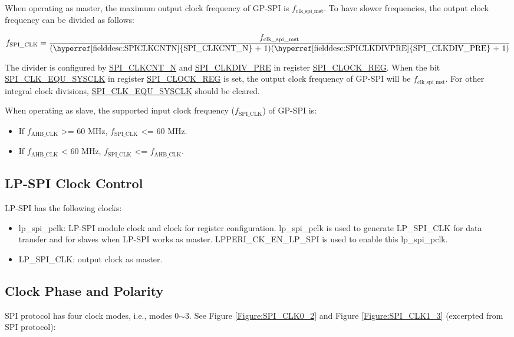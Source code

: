 \documentclass[main\_\_EN.tex]{subfiles}
\begin{document}
When operating as master, the maximum output clock frequency of GP-SPI is $f_{\textrm{clk\_spi\_mst}}$. To have slower frequencies, the output clock frequency can be divided as follows:

    \[
    f_{\textrm{SPI\_CLK}}=\frac{f_{\textrm{clk\_spi\_mst}}} {\textrm{(\hyperref[fielddesc:SPICLKCNTN]{SPI\_CLKCNT\_N} + 1)(\hyperref[fielddesc:SPICLKDIVPRE]{SPI\_CLKDIV\_PRE} + 1)}}
    \] \label{division-formula}

The divider is configured by \hyperref[fielddesc:SPICLKCNTN]{SPI\_CLKCNT\_N} and \hyperref[fielddesc:SPICLKDIVPRE]{SPI\_CLKDIV\_PRE} in register \hyperref[regdesc:SPICLOCKREG]{SPI\_CLOCK\_REG}. When the bit \hyperref[fielddesc:SPICLKEQUSYSCLK]{SPI\_CLK\_EQU\_SYSCLK} in register \hyperref[regdesc:SPICLOCKREG]{SPI\_CLOCK\_REG} is set, the output clock frequency of GP-SPI will be $f_{\textrm{clk\_spi\_mst}}$. For other integral clock divisions, \hyperref[fielddesc:SPICLKEQUSYSCLK]{SPI\_CLK\_EQU\_SYSCLK} should be cleared.

When operating as slave, the supported input clock frequency ($f_{\textrm{SPI\_CLK}}$)  of GP-SPI is:
\begin{itemize}
    \item If $f_{\textrm{AHB\_CLK}}$ >= 60 MHz, $f_{\textrm{SPI\_CLK}}$ <= 60 MHz.

    \item If $f_{\textrm{AHB\_CLK}}$ < 60 MHz, $f_{\textrm{SPI\_CLK}}$ <= $f_{\textrm{AHB\_CLK}}$.
\end{itemize}

\subsection{LP-SPI Clock Control}

LP-SPI has the following clocks:
\begin{itemize}
    \item lp\_spi\_pclk: LP-SPI module clock and clock for register configuration. lp\_spi\_pclk is used to generate LP\_SPI\_CLK for data transfer and for slaves when LP-SPI works as master. LPPERI\_CK\_EN\_LP\_SPI is used to enable this lp\_spi\_pclk.
    \item LP\_SPI\_CLK: output clock as master.
\end{itemize}

\subsection{Clock Phase and Polarity}
SPI protocol has four clock modes, i.e., modes 0$\sim$3. See Figure \ref{Figure:SPI_CLK0_2} and Figure \ref{Figure:SPI_CLK1_3} (excerpted from SPI protocol):
\end{document}
